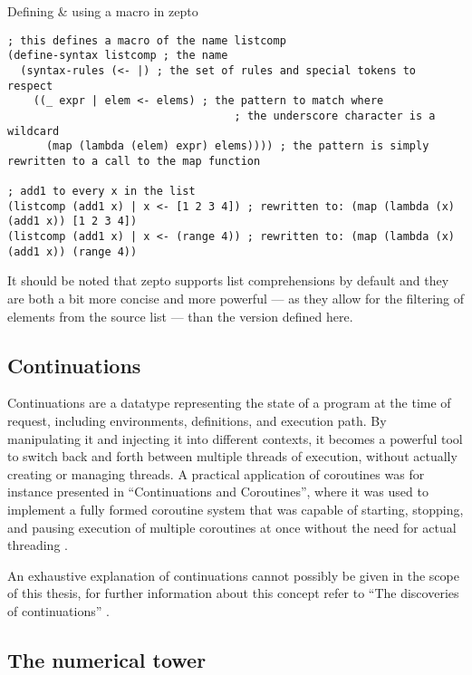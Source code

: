\documentclass[oneside,11pt,xetex]{scrbook}
\begin{document}
\begin{listing}[H]
\caption{Defining \& using a macro in zepto}
\begin{verbatim}
; this defines a macro of the name listcomp
(define-syntax listcomp ; the name
  (syntax-rules (<- |) ; the set of rules and special tokens to respect
    ((_ expr | elem <- elems) ; the pattern to match where
                                   ; the underscore character is a wildcard
      (map (lambda (elem) expr) elems)))) ; the pattern is simply rewritten to a call to the map function

; add1 to every x in the list
(listcomp (add1 x) | x <- [1 2 3 4]) ; rewritten to: (map (lambda (x) (add1 x)) [1 2 3 4])
(listcomp (add1 x) | x <- (range 4)) ; rewritten to: (map (lambda (x) (add1 x)) (range 4))
\end{verbatim}
\label{fig:listcomp}
\end{listing}

It should be noted that zepto supports list comprehensions by default and they are
both a bit more concise and more powerful --- as they allow for the filtering of
elements from the source list --- than the version defined here.

\subsection{Continuations}
\label{continuation}

Continuations are a datatype representing the state of a program at the time of
request, including environments, definitions, and execution path. By manipulating
it and injecting it into different contexts, it becomes a powerful tool to switch
back and forth between multiple threads of execution, without actually creating
or managing threads. A practical application of coroutines was for instance
presented in ``Continuations and Coroutines'', where it was used to implement a fully formed
coroutine system that was capable of starting, stopping, and pausing execution
of multiple coroutines at once without the need for actual threading \parencite{COR}.

An exhaustive explanation of continuations cannot possibly be given in the scope
of this thesis, for further information about this concept refer to ``The discoveries
of continuations'' \parencite{CONT}.

\subsection{The numerical tower}
\label{numbers}
\end{document}
